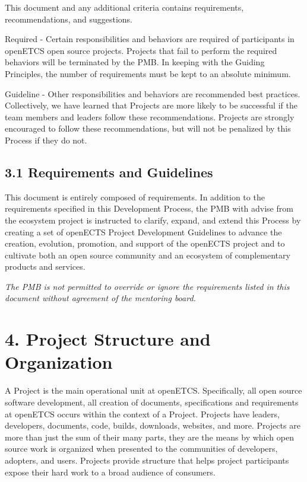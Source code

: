 This document and any additional criteria contains requirements,
recommendations, and suggestions.

Required - Certain responsibilities and behaviors are required of
participants in openETCS open source projects. Projects that fail to
perform the required behaviors will be terminated by the PMB. In keeping
with the Guiding Principles, the number of requirements must be kept to
an absolute minimum.

Guideline - Other responsibilities and behaviors are recommended best
practices. Collectively, we have learned that Projects are more likely
to be successful if the team members and leaders follow these
recommendations. Projects are strongly encouraged to follow these
recommendations, but will not be penalized by this Process if they do
not.

\subsection{3.1 Requirements and
Guidelines}\label{requirements-and-guidelines}

This document is entirely composed of requirements. In addition to the
requirements specified in this Development Process, the PMB with advise
from the ecosystem project is instructed to clarify, expand, and extend
this Process by creating a set of openECTS Project Development
Guidelines to advance the creation, evolution, promotion, and support of
the openECTS project and to cultivate both an open source community and
an ecosystem of complementary products and services.

\emph{The PMB is not permitted to override or ignore the requirements
listed in this document without agreement of the mentoring board.}

\section{4. Project Structure and
Organization}\label{project-structure-and-organization}

A Project is the main operational unit at openETCS. Specifically, all
open source software development, all creation of documents,
specifications and requirements at openETCS occurs within the context of
a Project. Projects have leaders, developers, documents, code, builds,
downloads, websites, and more. Projects are more than just the sum of
their many parts, they are the means by which open source work is
organized when presented to the communities of developers, adopters, and
users. Projects provide structure that helps project participants expose
their hard work to a broad audience of consumers.


